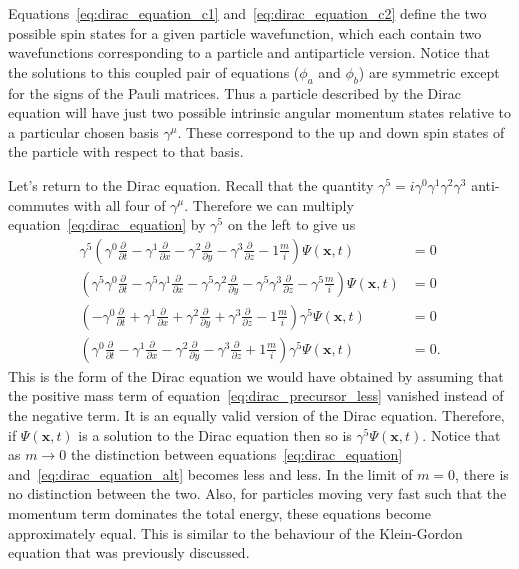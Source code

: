 \documentclass[titlepage,letterpaper,onecolumn,11pt,final]{report}
\newcommand{\psxt}{\Psi (\mathbf{x},t)}
\newcommand{\gama}{\gamma^{0}}
\newcommand{\gamb}{\gamma^{1}}
\newcommand{\gamc}{\gamma^{2}}
\newcommand{\gamd}{\gamma^{3}}
\newcommand{\gamf}{\gamma^{5}}
\numberwithin{equation}{section}
\numberwithin{figure}{section}
\begin{document}
Equations~\ref{eq:dirac_equation_c1} and~\ref{eq:dirac_equation_c2} define the two possible spin states for a given particle wavefunction, which each contain two wavefunctions corresponding to a particle and antiparticle version. Notice that the solutions to this coupled pair of equations ($\phi_{a}$ and $\phi_{b}$) are symmetric except for the signs of the Pauli matrices. Thus a particle described by the Dirac equation will have just two possible intrinsic angular momentum states relative to a particular chosen basis $\gamma^{\mu}$. These correspond to the up and down spin states of the particle with respect to that basis.

Let's return to the Dirac equation. Recall that the quantity $\gamf = i \gama \gamb \gamc \gamd$ anti-commutes with all four of $\gamma^{\mu}$. Therefore we can multiply equation~\ref{eq:dirac_equation} by $\gamf$ on the left to give us
\begin{equation}
\begin{split}
	\label{eq:dirac_equation_alt}
	\gamf \left(  \gama \frac{\partial}{\partial t} - \gamb \frac{\partial}{\partial x} - \gamc \frac{\partial}{\partial y} - \gamd \frac{\partial}{\partial z} - 1 \frac{m}{i} \right) \psxt &= 0 \\
	\left( \gamf \gama \frac{\partial}{\partial t} - \gamf \gamb \frac{\partial}{\partial x} - \gamf \gamc \frac{\partial}{\partial y} - \gamf \gamd \frac{\partial}{\partial z} - \gamf \frac{m}{i} \right) \psxt &= 0 \\
	\left(  - \gama \frac{\partial}{\partial t} + \gamb \frac{\partial}{\partial x} + \gamc \frac{\partial}{\partial y} + \gamd \frac{\partial}{\partial z} - 1 \frac{m}{i} \right) \gamf \psxt &= 0 \\
	\left(  \gama \frac{\partial}{\partial t} - \gamb \frac{\partial}{\partial x} - \gamc \frac{\partial}{\partial y} - \gamd \frac{\partial}{\partial z} + 1 \frac{m}{i} \right) \gamf \psxt &= 0.
\end{split}
\end{equation}
This is the form of the Dirac equation we would have obtained by assuming that the positive mass term of equation~\ref{eq:dirac_precursor_less} vanished instead of the negative term. It is an equally valid version of the Dirac equation. Therefore, if $\psxt$ is a solution to the Dirac equation then so is $\gamf \psxt$. Notice that as $m \rightarrow 0$ the distinction between equations~\ref{eq:dirac_equation} and~\ref{eq:dirac_equation_alt} becomes less and less. In the limit of $m=0$, there is no distinction between the two. Also, for particles moving very fast such that the momentum term dominates the total energy, these equations become approximately equal. This is similar to the behaviour of the Klein-Gordon equation that was previously discussed.
\end{document}
